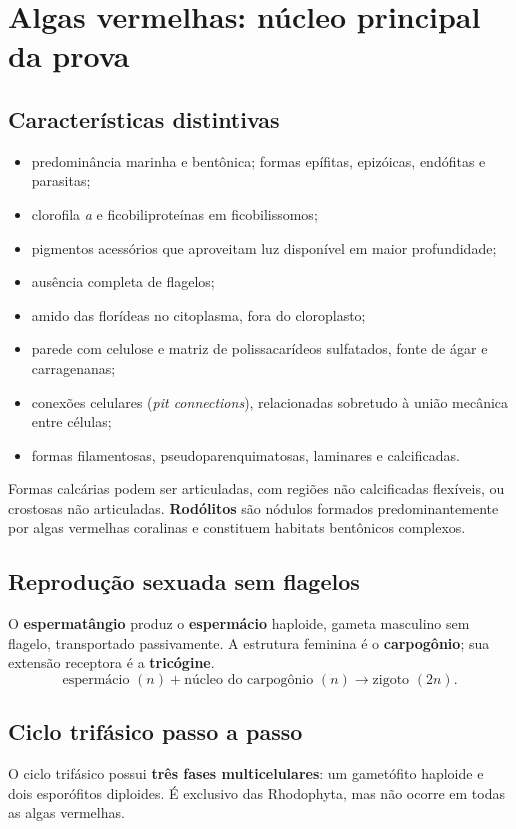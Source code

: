 \documentclass[12pt,a4paper]{article}
\begin{document}
\section{Algas vermelhas: núcleo principal da prova}

\subsection{Características distintivas}
\begin{itemize}
\item predominância marinha e bentônica; formas epífitas, epizóicas, endófitas e
parasitas;
\item clorofila \textit{a} e ficobiliproteínas em ficobilissomos;
\item pigmentos acessórios que aproveitam luz disponível em maior profundidade;
\item ausência completa de flagelos;
\item amido das florídeas no citoplasma, fora do cloroplasto;
\item parede com celulose e matriz de polissacarídeos sulfatados, fonte de ágar
e carragenanas;
\item conexões celulares (\textit{pit connections}), relacionadas sobretudo à
união mecânica entre células;
\item formas filamentosas, pseudoparenquimatosas, laminares e calcificadas.
\end{itemize}

Formas calcárias podem ser articuladas, com regiões não calcificadas flexíveis,
ou crostosas não articuladas. \textbf{Rodólitos} são nódulos formados
predominantemente por algas vermelhas coralinas e constituem habitats bentônicos
complexos.

\subsection{Reprodução sexuada sem flagelos}
O \textbf{esperma\-tângio} produz o \textbf{espermácio} haploide, gameta masculino
sem flagelo, transportado passivamente. A estrutura feminina é o
\textbf{carpogônio}; sua extensão receptora é a \textbf{tricógine}.
\[
\text{espermácio }(n)+\text{núcleo do carpogônio }(n)
\longrightarrow \text{zigoto }(2n).
\]

\subsection{Ciclo trifásico passo a passo}
O ciclo trifásico possui \textbf{três fases multicelulares}: um gametófito
haploide e dois esporófitos diploides. É exclusivo das Rhodophyta, mas não
ocorre em todas as algas vermelhas.
\end{document}
